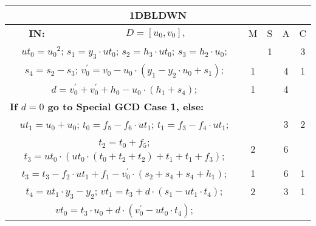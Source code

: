 \begin{tabular}{|c|cr|c|c|c|c|}
\hline
\multicolumn{7}{|c|}{\bf{1DBLDWN}} \TS \\
\hline
\bf{IN:} &\multicolumn{2}{|c|}{$D = [u_0,v_0], $}
\TS & M & \hspace{1pt}S\hspace{1pt} & A & \hspace{1pt}C\hspace{1pt} \\
\hline
\multicolumn{3}{|R{340pt}|}{ 
$ut_0=u_0{}^{2}$;\hspace{4pt}
$s_1=y_3 \cdot ut_0$;\hspace{4pt}
$s_2=h_3 \cdot ut_0$;\hspace{4pt}
$s_3=h_2 \cdot u_0$;\hspace{4pt}
} &  & 1 &  & 3\\
\multicolumn{3}{|R{340pt}|}{ 
$s_4=s_2-s_3$;\hspace{4pt}
$v^{\prime}_0=v_0-u_0 \cdot (y_1-y_2 \cdot u_0+s_1)$;\hspace{4pt}
} & 1 &  & 4 & 1\\
\multicolumn{3}{|R{340pt}|}{ 
$d=v^{\prime}_0+v^{\prime}_0+h_0-u_0 \cdot (h_1+s_4)$;\hspace{4pt}
} & 1 &  & 4 & \\
\multicolumn{3}{|l|}{ 
 \bf{If $d = 0$ go to Special GCD Case 1, else:} } &  &  &  & \\
\multicolumn{3}{|R{340pt}|}{ 
$ut_1=u_0+u_0$;\hspace{4pt}
$t_0=f_5-f_6 \cdot ut_1$;\hspace{4pt}
$t_1=f_3-f_4 \cdot ut_1$;\hspace{4pt}
} &  &  & 3 & 2\\
\multicolumn{3}{|R{340pt}|}{ 
$t_2=t_0+f_5$;\hspace{4pt}
$t_3=ut_0 \cdot (ut_0 \cdot (t_0+t_2+t_2)+t_1+t_1+f_3)$;\hspace{4pt}
} & 2 &  & 6 & \\
\multicolumn{3}{|R{340pt}|}{ 
$t_3=t_3-f_2 \cdot ut_1+f_1-v^{\prime}_0 \cdot (s_2+s_4+s_4+h_1)$;\hspace{4pt}
} & 1 &  & 6 & 1\\
\multicolumn{3}{|R{340pt}|}{ 
$t_4=ut_1 \cdot y_3-y_2$;\hspace{4pt}
$vt_1=t_3+d \cdot (s_1-ut_1 \cdot t_4)$;\hspace{4pt}
} & 2 &  & 3 & 1\\
\multicolumn{3}{|R{340pt}|}{ 
$vt_0=t_3 \cdot u_0+d \cdot (v^{\prime}_0-ut_0 \cdot t_4)$;\hspace{4pt}
}
\end{tabular}
